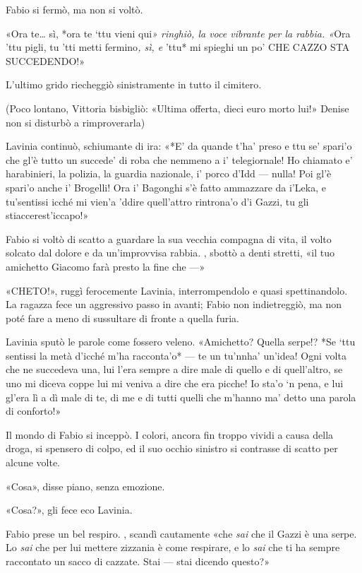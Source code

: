 Fabio si fermò, ma non si voltò.

«Ora te\ldots{} sì, *ora te `ttu vieni qui\emph{» ringhiò, la voce vibrante per la rabbia. «}Ora 'ttu pigli, tu 'tti metti fermino\emph{, sì, e }'ttu* mi spieghi un po' CHE CAZZO STA
SUCCEDENDO!»

L'ultimo grido riecheggiò sinistramente in tutto il cimitero.

(Poco lontano, Vittoria bisbigliò: «Ultima offerta, dieci euro morto lui!» Denise non si disturbò a rimproverarla)

Lavinia continuò, schiumante di ira: «*E' da quande t'ha' preso e ttu se' spari'o che gl'è tutto un succede' di roba che nemmeno a i' telegiornale! Ho chiamato e' harabinieri, la polizia, la guardia nazionale, i' porco d'Idd --- nulla! Poi gl'è spari'o anche i' Brogelli! Ora i' Bagonghi s'è fatto ammazzare da i'Leka, e tu'sentissi icché mi vien'a 'ddire quell'attro rintrona'o d'i Gazzi, tu gli stiaccerest'iccapo!»

Fabio si voltò di scatto a guardare la sua vecchia compagna di vita, il volto solcato dal dolore e da un'improvvisa rabbia. , sbottò a denti stretti, «il tuo amichetto Giacomo farà presto la fine che ---»

«CHETO!», ruggì ferocemente Lavinia, interrompendolo e quasi spettinandolo. La ragazza fece un aggressivo passo in avanti; Fabio non indietreggiò, ma non poté fare a meno di sussultare di fronte a quella furia.

Lavinia sputò le parole come fossero veleno. «Amichetto? Quella serpe!? *Se `ttu sentissi la metà d'icché m'ha racconta'o* --- te un tu'nnha' un'idea! Ogni volta che ne succedeva una, lui l'era sempre a dire male di quello e di quell'altro, se uno mi diceva coppe lui mi veniva a dire che era picche! Io sta'o `n pena, e lui gl'era lì a dì male di te, di me e di tutti quelli che m'hanno ma' detto una parola di conforto!»

Il mondo di Fabio si inceppò. I colori, ancora fin troppo vividi a causa della droga, si spensero di colpo, ed il suo occhio sinistro si contrasse di scatto per alcune volte.

«Cosa», disse piano, senza emozione.

«Cosa?», gli fece eco Lavinia.

Fabio prese un bel respiro. , scandì cautamente «che \emph{sai} che il Gazzi è una serpe. Lo \emph{sai} che per lui mettere zizzania è come respirare, e lo \emph{sai} che ti ha sempre raccontato un sacco di cazzate. Stai --- stai dicendo questo?»

